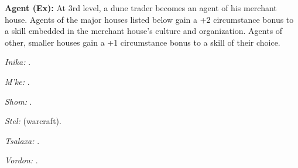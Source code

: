 {%





\textbf{Agent (Ex):} At 3rd level, a dune trader becomes an agent of his merchant house. Agents of the major houses listed below gain a +2 circumstance bonus to a skill embedded in the merchant house's culture and organization. Agents of other, smaller houses gain a +1 circumstance bonus to a skill of their choice.

\textit{Inika:} .

\textit{M'ke:} .

\textit{Shom:} .

\textit{Stel:}  (warcraft).

\textit{Tsalaxa:} .

\textit{Vordon:} .

}
